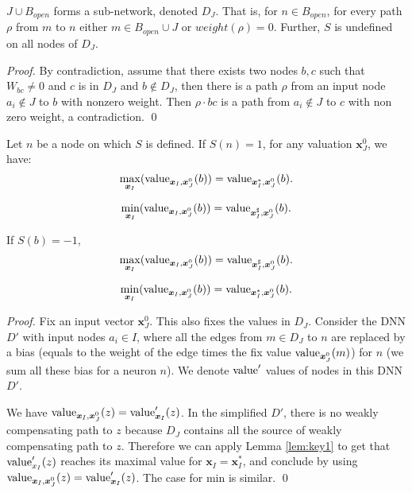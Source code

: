 			
			
			\begin{lemma}\label{lem:subnetwork2}
				$J \cup B_{open}$ forms a sub-network, denoted $D_J$.
				That is, for $n \in B_{open}$, for every path $\rho$ from $m$ to $n$
				either $m \in B_{open}\cup J$ or $weight(\rho)=0$. 
				Further, $S$ is undefined on all nodes of $D_J$.
			\end{lemma}
			
			\begin{proof}
				By contradiction, assume that there exists two nodes $b,c$ such that $W_{bc}\neq 0$ and $c$ is in $D_J$ and $b \notin D_J$, then 
				there is a path $\rho$ from an input node $a_i \notin J$ to $b$
				 with nonzero weight. Then $\rho \cdot bc$ is a path from $a_i \notin J$ 
				 to $c$ with non zero weight, a contradiction. \qed
			\end{proof}
			\fi




			
			
			
			\begin{lemma} \label{lem:reach_max_2}
				Let $n$ be a node on which $S$ is defined. If $S(n)=1$,
				for any valuation $\boldsymbol{x}^0_J$,	we have: 
				$$\max_{\boldsymbol{x}_I} ({\textrm{value}}_{\boldsymbol{x}_I,\boldsymbol{x}^0_J}(b)) =  {\textrm{value}}_{\boldsymbol{x}_I^*,\boldsymbol{x}^0_J}(b).$$
				
				$$\min_{\boldsymbol{x}_I} ({\textrm{value}}_{\boldsymbol{x}_I,\boldsymbol{x}^0_J}(b)) =  {\textrm{value}}_{\boldsymbol{x}_I^{\sharp},\boldsymbol{x}^0_J}(b).$$
				
				
				If $S(b)=-1$, 
				$$\max_{\boldsymbol{x}_I} ({\textrm{value}}_{\boldsymbol{x}_I,\boldsymbol{x}^0_J}(b)) =  {\textrm{value}}_{\boldsymbol{x}_I^{\sharp},\boldsymbol{x}^0_J}(b).$$
				
				$$\min_{\boldsymbol{x}_I} ({\textrm{value}}_{\boldsymbol{x}_I,\boldsymbol{x}^0_J}(b)) =  {\textrm{value}}_{\boldsymbol{x}_I^{*},\boldsymbol{x}^0_J}(b).$$
				
			\end{lemma}
			
			\begin{proof}	
				Fix an input vector $\boldsymbol{x}^0_J$.
				This also fixes the values in $D_J$.
				Consider the DNN $D'$ with input nodes $a_i\in I$, where all the 
				edges from $m \in D_J$ to $n$ are replaced by a bias (equals to the weight of the edge times the fix value ${\textrm{value}}_{\boldsymbol{x}^0_J}(m)$) for $n$ (we sum all these bias for a neuron $n$).
				We denote ${\textrm{value}}'$ values of nodes in this DNN $D'$.
				 
				We have ${\textrm{value}}_{\boldsymbol{x}_I,\boldsymbol{x}^0_J}(z) = {\textrm{value}}'_{\boldsymbol{x}_I}(z)$.
				In the simplified $D'$, there is no weakly compensating path to $z$ because 
				$D_J$ contains all the source of weakly compensating path to $z$.
				Therefore we can apply Lemma \ref{lem:key1} to get that 
				${\textrm{value}}'_{x_I}(z)$ reaches its maximal value for $\boldsymbol{x}_I=\boldsymbol{x}_I^*$, and conclude by using ${\textrm{value}}_{\boldsymbol{x}_I,\boldsymbol{x}^0_J}(z) = {\textrm{value}}'_{\boldsymbol{x}_I}(z)$. The case for min is similar. \qed
			\end{proof}
			
